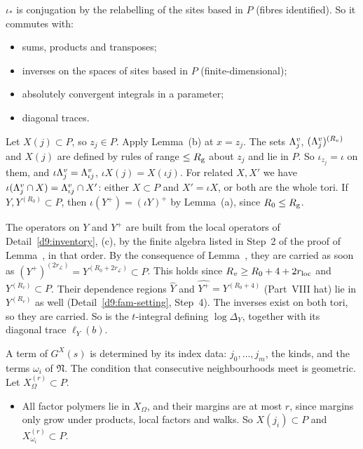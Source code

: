 \begin{detail}\label{d9:transfer}
$\iota_*$ is conjugation by the relabelling of the sites based in $P$ (fibres identified). So it commutes with:
\begin{itemize}
\item sums, products and transposes;
\item inverses on the spaces of sites based in $P$ (finite-dimensional);
\item absolutely convergent integrals in a parameter;
\item diagonal traces.
\end{itemize}
\begin{step}[Domains]
Let $X(j)\subset P$, so $z_j\in P$. Apply Lemma~(b) at $x=z_j$. The sets $\Lambda^v_j$, $(\Lambda^v_j)^{(R_v)}$ and $X(j)$ are defined by rules of range $\le R_{\rm g}$ about $z_j$ and lie in $P$. So $\iota_{z_j}=\iota$ on them, and $\iota\Lambda^v_j=\Lambda^v_{\iota j}$, $\iota X(j)=X(\iota j)$. For related $X,X'$ we have $\iota(\Lambda^v_j\cap X)=\Lambda^v_{\iota j}\cap X'$: either $X\subset P$ and $X'=\iota X$, or both are the whole tori. If $Y,Y^{(R_0)}\subset P$, then $\iota(Y^+)=(\iota Y)^+$ by Lemma~(a), since $R_0\le R_{\rm g}$.
\end{step}
\begin{step}
The operators on $Y$ and $Y^+$ are built from the local operators of Detail~\ref{d9:inventory}, (c), by the finite algebra listed in Step~2 of the proof of Lemma~, in that order. By the consequence of Lemma~, they are carried as soon as $(Y^+)^{(2r_{\mathcal L})}=Y^{(R_0+2r_{\mathcal L})}\subset P$. This holds since $R_v\ge R_0+4+2r_{\rm loc}$ and $Y^{(R_v)}\subset P$. Their dependence regions $\hat Y$ and $\widehat{Y^+}=Y^{(R_0+4)}$ (Part~VIII hat) lie in $Y^{(R_v)}$ as well (Detail~\ref{d9:fam-setting}, Step~4). The inverses exist on both tori, so they are carried. So is the $t$-integral defining $\log\Delta_Y$, together with its diagonal trace $\ell_Y(b)$.
\end{step}
\begin{step}
A term of $G^X(s)$ is determined by its index data: $j_0,\dots,j_m$, the kinds, and the terms $\omega_i$ of $\mathfrak N$. The condition that consecutive neighbourhoods meet is geometric. Let $X_\Omega^{(r)}\subset P$.
\begin{itemize}
\item All factor polymers lie in $X_\Omega$, and their margins are at most $r$, since margins only grow under products, local factors and walks. So $X(j_i)\subset P$ and $X_{\omega_i}^{(r)}\subset P$.

\end{itemize}
\end{step}
\end{detail}
